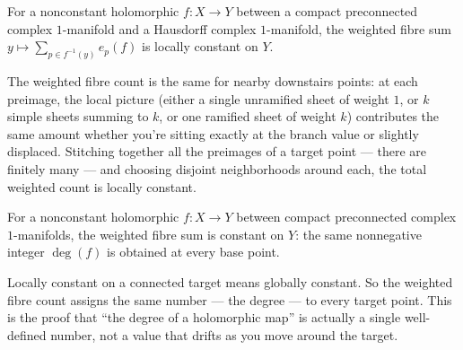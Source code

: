 \begin{lemma}
\label{lem:weighted-fiber-locally-constant}
For a nonconstant holomorphic \(f:X\to Y\) between a compact
preconnected complex \(1\)-manifold and a Hausdorff complex
\(1\)-manifold, the weighted fibre sum
\(y\mapsto\sum_{p\in f^{-1}(y)}e_p(f)\) is locally constant on \(Y\).
\leanok
\end{lemma}

\begin{layman}
The weighted fibre count is the same for nearby downstairs points: at
each preimage, the local picture (either a single unramified sheet of
weight \(1\), or \(k\) simple sheets summing to \(k\), or one
ramified sheet of weight \(k\)) contributes the same amount whether
you're sitting exactly at the branch value or slightly displaced.
Stitching together all the preimages of a target point — there are
finitely many — and choosing disjoint neighborhoods around each, the
total weighted count is locally constant.
\end{layman}

\begin{theorem}
\label{thm:branched-degree-well-defined}
For a nonconstant holomorphic \(f:X\to Y\) between compact preconnected
complex \(1\)-manifolds, the weighted fibre sum is constant on \(Y\):
the same nonnegative integer \(\deg(f)\) is obtained at every base
point.
\leanok
\end{theorem}

\begin{layman}
Locally constant on a connected target means globally constant. So the
weighted fibre count assigns the same number — the degree — to every
target point. This is the proof that ``the degree of a holomorphic map''
is actually a single well-defined number, not a value that drifts as
you move around the target.
\end{layman}

